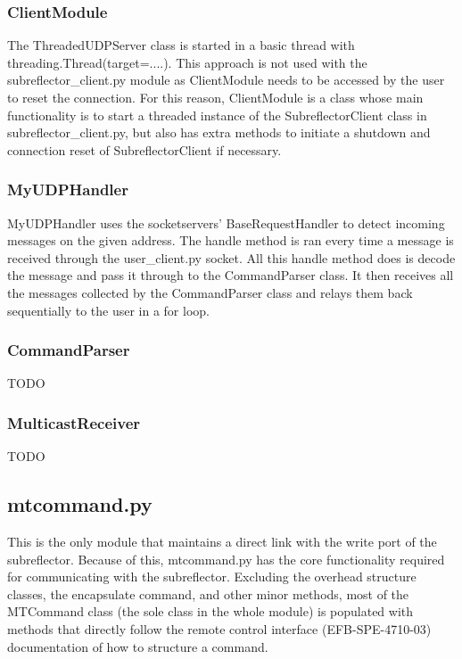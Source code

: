 \documentclass{article}
\begin{document}
\subsubsection{ClientModule}
The ThreadedUDPServer class is started in a basic thread with threading.Thread(target=....). This approach is not used with the subreflector\_client.py  module as ClientModule needs to be accessed by the user to reset the connection. For this reason, ClientModule is a class whose main functionality is to start a threaded instance of the SubreflectorClient class in subreflector\_client.py, but also has extra methods to initiate a shutdown and connection reset of SubreflectorClient if necessary.

\subsubsection{MyUDPHandler}

MyUDPHandler uses the socketservers' BaseRequestHandler to detect incoming messages on the given address. The handle method is ran every time a message is received through the user\_client.py socket. All this handle method does is decode the message and pass it through to the CommandParser class. It then receives all the messages collected by the CommandParser class and relays them back sequentially to the user in a for loop.

\subsubsection{CommandParser}

TODO


\subsubsection{MulticastReceiver}

TODO




\newpage
\subsection{mtcommand.py}

This is the only module that maintains a direct link with the write port of the subreflector. Because of this, mtcommand.py has the core functionality required for communicating with the subreflector. Excluding  the overhead structure classes, the encapsulate command, and other minor methods, most of the MTCommand class (the sole class in the whole module) is populated with methods that directly follow the remote control interface (EFB-SPE-4710-03)  documentation of how to structure a command.
\end{document}
